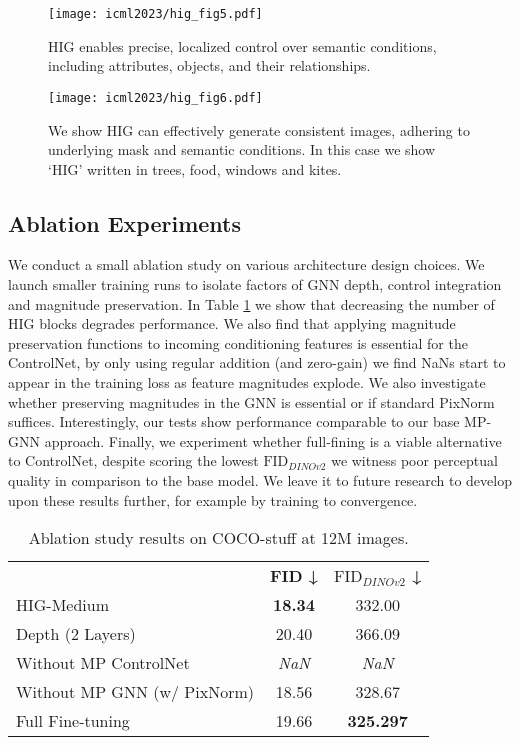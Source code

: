 \begin{figure}[t]
    \centering
    \texttt{[image: icml2023/hig\_fig5.pdf]}
    \vspace{-20pt}
    \caption{HIG enables precise, localized control over semantic conditions, including attributes, objects, and their relationships.}
    \label{fig:colour_editing}
\end{figure}

\begin{figure}[t]
    \centering
\texttt{[image: icml2023/hig\_fig6.pdf]}
    \vspace{-20bp}
    \caption{We show HIG can effectively generate consistent images, adhering to underlying mask and semantic conditions. In this case we show `HIG' written in trees, food, windows and kites.}
    \label{fig:fusion}
\end{figure}

\subsection{Ablation Experiments}
We conduct a small ablation study on various architecture design choices. We launch smaller training runs to isolate factors of GNN depth, control integration and magnitude preservation. In Table \ref{table:ablation} we show that decreasing the number of HIG blocks degrades performance. We also find that applying magnitude preservation functions to incoming conditioning features is essential for the ControlNet, by only using regular addition (and zero-gain) we find NaNs start to appear in the training loss as feature magnitudes explode. We also investigate whether preserving magnitudes in the GNN is essential or if standard PixNorm suffices. Interestingly, our tests show performance comparable to our base MP-GNN approach. Finally, we experiment whether full-fining is a viable alternative to ControlNet, despite scoring the lowest $\text{FID}_{\textit{DINOv2}}$ we witness poor perceptual quality in comparison to the base model. We leave it to future research to develop upon these results further, for example by training to convergence.
\begin{table}[t]
\centering
\caption{Ablation study results on COCO-stuff at 12M images.} 

\begin{tabular}{@{}lcc@{}}
\toprule

& \textbf{FID ↓} & \textbf{$\text{FID}_{\textit{DINOv2}}$ ↓} \\ \cmidrule{2-3}
HIG-Medium & \textbf{18.34} & 332.00 \\
\midrule 
Depth (2 Layers) & 20.40 & 366.09 \\
Without MP ControlNet & \textit{NaN} & \textit{NaN} \\
Without MP GNN (w/ PixNorm) & 18.56 & 328.67 \\
Full Fine-tuning & 19.66 & \textbf{325.297} \\
\bottomrule
\end{tabular}
\label{table:ablation}
\end{table}
